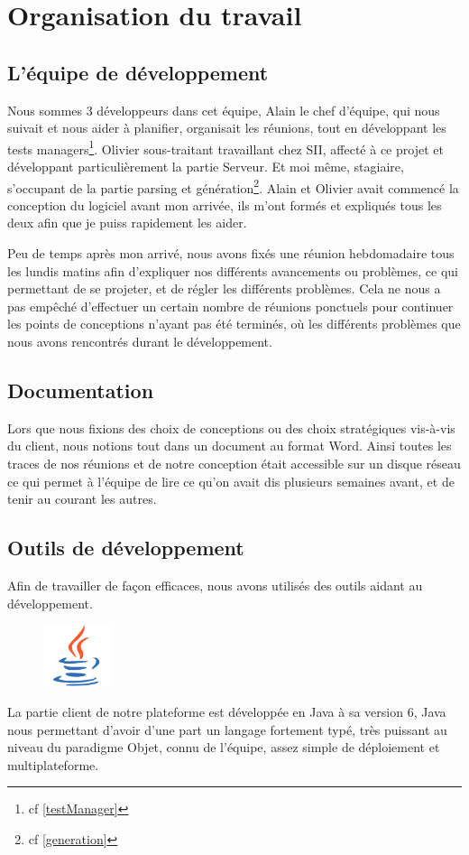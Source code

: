 \chapter{Organisation du travail}
\section{L'équipe de développement}
Nous sommes 3 développeurs dans cet équipe, Alain  le chef d'équipe, qui nous suivait et nous aider à planifier, organisait les réunions, tout en développant les tests managers\footnote{cf \ref{testManager}}. Olivier  sous-traitant travaillant chez SII, affecté à ce projet et développant particulièrement la partie Serveur. Et moi même, stagiaire, s'occupant de la partie parsing et génération\footnote{cf \ref{generation}}. Alain et Olivier avait commencé la conception du logiciel avant mon arrivée, ils m'ont formés et expliqués tous les deux afin que je puiss rapidement les aider.

Peu de temps après mon arrivé, nous avons fixés une réunion hebdomadaire tous les lundis matins afin d'expliquer nos différents avancements ou problèmes, ce qui permettant de se projeter, et de régler les différents problèmes. Cela ne nous a pas empêché d'effectuer un certain nombre de réunions ponctuels pour continuer les points de conceptions n'ayant pas été terminés, où les différents problèmes que nous avons rencontrés durant le développement.

\section{Documentation}
Lors que nous fixions des choix de conceptions ou des choix stratégiques vis-à-vis du client, nous notions tout dans un document au format Word. Ainsi toutes les traces de nos réunions et de notre conception était accessible sur un disque réseau ce qui permet à l'équipe de lire ce qu'on avait dis plusieurs semaines avant, et de tenir au courant les autres.

\section{Outils de développement}
Afin de travailler de façon efficaces, nous avons utilisés des outils aidant au développement.

\begin{figure}
	\includegraphics[width=2cm]{contents/images/logoJava.png}
\end{figure}
La partie client de notre plateforme est développée en Java à sa version 6, Java nous permettant d'avoir d'une part un langage fortement typé, très puissant au niveau du paradigme Objet, connu de l'équipe, assez simple de déploiement et multiplateforme. 

